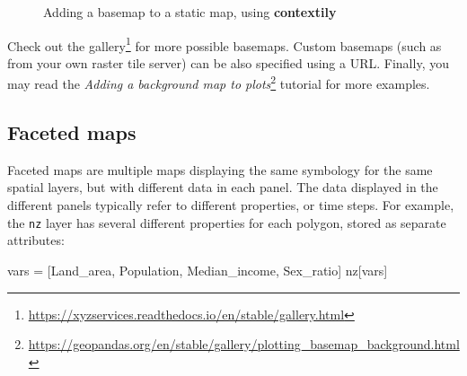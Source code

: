 \documentclass[
  letterpaper,
]{krantz}
\newenvironment{Shaded}{\begin{snugshade}}{\end{snugshade}}
\newcommand{\BuiltInTok}[1]{\textcolor[rgb]{0.00,0.23,0.31}{#1}}
\newcommand{\NormalTok}[1]{\textcolor[rgb]{0.00,0.23,0.31}{#1}}
\newcommand{\OperatorTok}[1]{\textcolor[rgb]{0.37,0.37,0.37}{#1}}
\newcommand{\StringTok}[1]{\textcolor[rgb]{0.13,0.47,0.30}{#1}}
\begin{document}
\begin{figure}

\begin{minipage}{0.50\linewidth}



\end{minipage}%
%
\begin{minipage}{0.50\linewidth}



\end{minipage}%

\caption{\label{fig-basemap}Adding a basemap to a static map, using
\textbf{contextily}}

\end{figure}%

Check out the gallery\footnote{\url{https://xyzservices.readthedocs.io/en/stable/gallery.html}}
for more possible basemaps. Custom basemaps (such as from your own
raster tile server) can be also specified using a URL. Finally, you may
read the \emph{Adding a background map to plots}\footnote{\url{https://geopandas.org/en/stable/gallery/plotting_basemap_background.html}}
tutorial for more examples.

\subsection{Faceted maps}\label{sec-faceted-maps}

Faceted maps are multiple maps displaying the same symbology for the
same spatial layers, but with different data in each panel. The data
displayed in the different panels typically refer to different
properties, or time steps. For example, the \texttt{nz} layer has
several different properties for each polygon, stored as separate
attributes:

\begin{Shaded}
\begin{Highlighting}[]
\BuiltInTok{vars} \OperatorTok{=}\NormalTok{ [}\StringTok{\textquotesingle{}Land\_area\textquotesingle{}}\NormalTok{, }\StringTok{\textquotesingle{}Population\textquotesingle{}}\NormalTok{, }\StringTok{\textquotesingle{}Median\_income\textquotesingle{}}\NormalTok{, }\StringTok{\textquotesingle{}Sex\_ratio\textquotesingle{}}\NormalTok{]}
\NormalTok{nz[}\BuiltInTok{vars}\NormalTok{]}
\end{Highlighting}
\end{Shaded}
\end{document}
